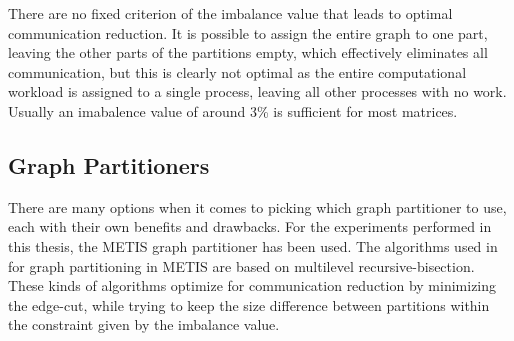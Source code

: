 There are no fixed criterion of the imbalance value that leads to optimal communication reduction. It is possible to assign the entire graph to one part, leaving the other parts of the partitions empty, which effectively eliminates all communication, but this is clearly not optimal as the entire computational workload is assigned to a single process, leaving all other processes with no work. Usually an imabalence value of around 3\% is sufficient for most matrices.
\medskip


\subsection{Graph Partitioners}
There are many options when it comes to picking which graph partitioner to use, each with their own benefits and drawbacks. For the experiments performed in this thesis, the METIS graph partitioner has been used. The algorithms used in for graph partitioning in METIS are based on multilevel recursive-bisection. These kinds of algorithms optimize for communication reduction by minimizing the edge-cut, while trying to keep the size difference between partitions within the constraint given by the imbalance value.






